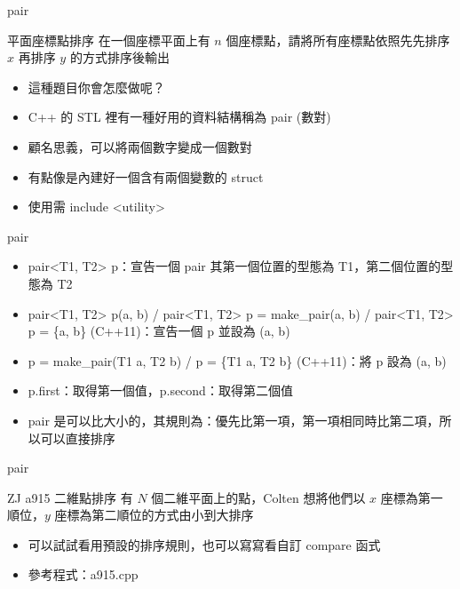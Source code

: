 \documentclass[aspectratio=169]{beamer}
\begin{document}
    \begin{frame}{pair}
        \begin{block}{平面座標點排序}
            在一個座標平面上有 $n$ 個座標點，請將所有座標點依照先先排序 $x$ 再排序 $y$ 的方式排序後輸出
        \end{block}
        
        \begin{itemize}
            \item<2-> 這種題目你會怎麼做呢？
            \item<3-> C++ 的 STL 裡有一種好用的資料結構稱為 pair (數對)
            \item<3-> 顧名思義，可以將兩個數字變成一個數對
            \item<4-> 有點像是內建好一個含有兩個變數的 struct
            \item<4-> 使用需 include <utility>
        \end{itemize}
    \end{frame}

    \begin{frame}{pair}
        \begin{itemize}
            \item<1-> pair<T1, T2> p：宣告一個 pair 其第一個位置的型態為 T1，第二個位置的型態為 T2
            \item<2-> pair<T1, T2> p(a, b) / pair<T1, T2> p = make\_pair(a, b) / pair<T1, T2> p = \{a, b\} (C++11)：宣告一個 p 並設為 (a, b)
            \item<3-> p = make\_pair(T1 a, T2 b) / p = \{T1 a, T2 b\} (C++11)：將 p 設為 (a, b)
            \item<4-> p.first：取得第一個值，p.second：取得第二個值
            \item<5-> pair 是可以比大小的，其規則為：優先比第一項，第一項相同時比第二項，所以可以直接排序
        \end{itemize}
    \end{frame}

    \begin{frame}{pair}
        \begin{block}{ZJ a915 二維點排序}
            有 $N$ 個二維平面上的點，Colten 想將他們以 $x$ 座標為第一順位，$y$ 座標為第二順位的方式由小到大排序
        \end{block}

        \begin{itemize}
            \item 可以試試看用預設的排序規則，也可以寫寫看自訂 compare 函式
            \item 參考程式：a915.cpp
        \end{itemize}
    \end{frame}
\end{document}
